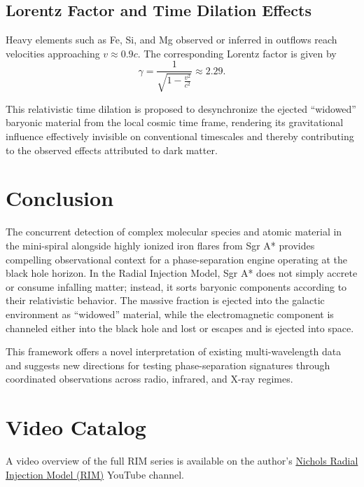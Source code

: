 \documentclass[12pt]{article}
\begin{document}
\subsection{Lorentz Factor and Time Dilation Effects}

Heavy elements such as Fe, Si, and Mg observed or inferred in outflows reach velocities approaching $v \approx 0.9c$. The corresponding Lorentz factor is given by
\begin{equation}
\gamma = \frac{1}{\sqrt{1 - \frac{v^2}{c^2}}} \approx 2.29.
\end{equation}

This relativistic time dilation is proposed to desynchronize the ejected ``widowed'' baryonic material from the local cosmic time frame, rendering its gravitational influence effectively invisible on conventional timescales and thereby contributing to the observed effects attributed to dark matter.

\section{Conclusion}

The concurrent detection of complex molecular species and atomic material in the mini-spiral alongside highly ionized iron flares from Sgr A* provides compelling observational context for a phase-separation engine operating at the black hole horizon. In the Radial Injection Model, Sgr A* does not simply accrete or consume infalling matter; instead, it  sorts baryonic components according to their relativistic behavior. The massive fraction is ejected into the galactic environment as ``widowed'' material, while the electromagnetic component is channeled either into the black hole and lost or escapes and is ejected into space.

This framework offers a novel interpretation of existing multi-wavelength data and suggests new directions for testing phase-separation signatures through coordinated observations across radio, infrared, and X-ray regimes.

\section{Video Catalog}
A video overview of the full RIM series is available on the author's \href{https://www.youtube.com/@Nichols_Thought_Experiments}{Nichols Radial Injection Model (RIM)} YouTube channel.
\end{document}
